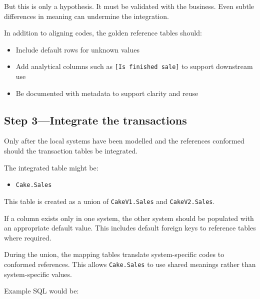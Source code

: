 \documentclass[10pt,openany,10pt]{book}
\providecommand{\tightlist}{%
  \setlength{\itemsep}{0pt}\setlength{\parskip}{0pt}}
\begin{document}
But this is only a hypothesis. It must be validated with the business.
Even subtle differences in meaning can undermine the integration.

In addition to aligning codes, the golden reference tables should:

\begin{itemize}
\tightlist
\item
  Include default rows for unknown values
\item
  Add analytical columns such as \texttt{{[}Is\ finished\ sale{]}} to
  support downstream use
\item
  Be documented with metadata to support clarity and reuse
\end{itemize}

\subsection{Step 3---Integrate the
transactions}\label{step-3integrate-the-transactions}

Only after the local systems have been modelled and the references
conformed should the transaction tables be integrated.

The integrated table might be:

\begin{itemize}
\tightlist
\item
  \texttt{Cake.Sales}
\end{itemize}

This table is created as a union of \texttt{CakeV1.Sales} and
\texttt{CakeV2.Sales}.

If a column exists only in one system, the other system should be
populated with an appropriate default value. This includes default
foreign keys to reference tables where required.

During the union, the mapping tables translate system-specific codes to
conformed references. This allows \texttt{Cake.Sales} to use shared
meanings rather than system-specific values.

Example SQL would be:
\end{document}
